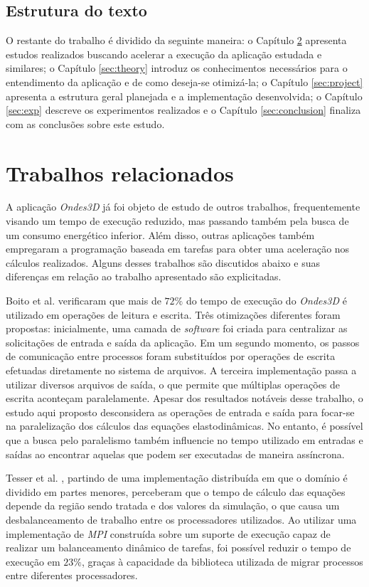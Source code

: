 \documentclass[cic,tc]{iiufrgs}
\begin{document}
\section{Estrutura do texto}

O restante do trabalho é dividido da seguinte maneira: o Capítulo \ref{sec:related} apresenta estudos realizados buscando acelerar a execução da aplicação estudada e similares; o Capítulo
\ref{sec:theory} introduz os conhecimentos necessários para o entendimento da aplicação e de como deseja-se otimizá-la; o Capítulo \ref{sec:project} apresenta a estrutura geral planejada e
a implementação desenvolvida; o Capítulo \ref{sec:exp} descreve os experimentos realizados e o Capítulo \ref{sec:conclusion} finaliza com as conclusões sobre este estudo. 

\chapter{Trabalhos relacionados}\label{sec:related}

A aplicação \textit{Ondes3D} já foi objeto de estudo de outros trabalhos, frequentemente visando um tempo de execução reduzido, mas passando também pela busca de um consumo energético 
inferior. Além disso, outras aplicações também empregaram a programação baseada em tarefas para obter uma aceleração nos cálculos realizados. Alguns desses trabalhos são discutidos abaixo e
suas diferenças em relação ao trabalho apresentado são explicitadas.

Boito et al. \cite{boito} verificaram que mais de $72\%$ do tempo de execução do \textit{Ondes3D} é utilizado em operações de leitura e escrita. Três otimizações diferentes foram
propostas: inicialmente, uma camada de \textit{software} foi criada para centralizar as solicitações de entrada e saída da aplicação. Em um segundo momento, os passos de comunicação entre
processos foram substituídos por operações de escrita efetuadas diretamente no sistema de arquivos. A terceira implementação passa a utilizar diversos arquivos de saída, o que permite que
múltiplas operações de escrita aconteçam paralelamente. Apesar dos resultados notáveis desse trabalho, o estudo aqui proposto desconsidera as operações de entrada e saída para focar-se
na paralelização dos cálculos das equações elastodinâmicas. No entanto, é possível que a busca pelo paralelismo também influencie no tempo utilizado em entradas e saídas ao encontrar aquelas
que podem ser executadas de maneira assíncrona. 

Tesser et al. \cite{dupros:hal-00797682}, partindo de uma implementação distribuída em que o domínio é dividido em partes menores, perceberam que o tempo de cálculo das equações
depende da região sendo tratada e dos valores da simulação, o que causa um desbalanceamento de trabalho entre os processadores utilizados. Ao utilizar uma implementação de \textit{MPI} construída sobre um suporte de execução capaz de realizar um balanceamento dinâmico de tarefas, foi possível reduzir o tempo de execução em $23\%$, graças à capacidade da biblioteca utilizada de migrar processos entre diferentes processadores.
\end{document}
